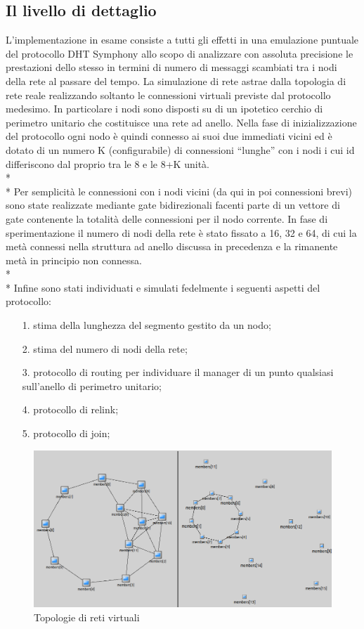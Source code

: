 \documentclass[	
	DIV=calc,
	paper=a4,
	fontsize=11pt,
	onecolumn
]{scrartcl} %
\begin{document}
	\subsection{Il livello di dettaglio}
	L'implementazione in esame consiste a tutti gli effetti in una emulazione puntuale del protocollo DHT Symphony allo scopo di analizzare con assoluta precisione le prestazioni dello stesso in termini di numero di messaggi scambiati tra i nodi della rete al passare del tempo. La simulazione di rete astrae dalla topologia di rete reale realizzando soltanto le connessioni virtuali previste dal protocollo medesimo. In particolare i nodi sono disposti su di un ipotetico cerchio di perimetro unitario che costituisce una rete ad anello. Nella fase di inizializzazione del protocollo ogni nodo è quindi connesso ai suoi due immediati vicini ed è dotato di un numero K (configurabile) di connessioni ``lunghe'' con i nodi i cui id differiscono dal proprio tra le 8 e le 8+K unità. \\*\\*
Per semplicità le connessioni con i nodi vicini (da qui in poi connessioni brevi) sono state realizzate mediante gate bidirezionali facenti parte di un vettore di gate contenente la totalità delle connessioni per il nodo corrente. In fase di sperimentazione il numero di nodi della rete è stato fissato a 16, 32 e 64, di cui la metà connessi nella struttura ad anello discussa in precedenza e la rimanente metà in principio non connessa.\\*\\* 
Infine sono stati individuati e simulati fedelmente i seguenti aspetti del protocollo:
	\begin{itemize}
		\item[1.] stima della lunghezza del segmento gestito da un nodo;
		\item[2.] stima del numero di nodi della rete;
		\item[3.] protocollo di routing per individuare il manager di un punto qualsiasi sull'anello di perimetro unitario;
		\item[4.] protocollo di relink;
		\item[5.] protocollo di join;
	\end{itemize}

\begin{figure}
	\centering
	\includegraphics[scale=0.35]{topologia.png}
	\caption{Topologie di reti virtuali}
	\label{Figura 1}
\end{figure}
\end{document}
